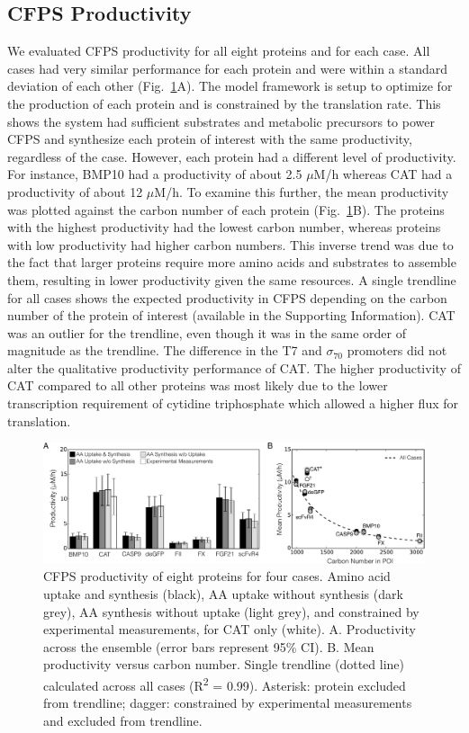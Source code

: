 \documentclass[journal=asbcd6,manuscript=article]{achemso}
\begin{document}
\subsection{CFPS Productivity}
We evaluated CFPS productivity for all eight proteins and for each case.
All cases had very similar performance for each protein and were within a standard deviation of each other (Fig.~\ref{fig:Prod}A).
The model framework is setup to optimize for the production of each protein and is constrained by the translation rate.  
This shows the system had sufficient substrates and metabolic precursors to power CFPS and synthesize each protein of interest with the same productivity, regardless of the case.
However, each protein had a different level of productivity.
For instance, BMP10 had a productivity of about 2.5 $\mu$M/h whereas CAT had a productivity of about 12 $\mu$M/h.
To examine this further, the mean productivity was plotted against the carbon number of each protein (Fig.~\ref{fig:Prod}B).
The proteins with the highest productivity had the lowest carbon number, whereas proteins with low productivity had higher carbon numbers.
This inverse trend was due to the fact that larger proteins require more amino acids and substrates to assemble them, resulting in lower productivity given the same resources.
A single trendline for all cases shows the expected productivity in CFPS depending on the carbon number of the protein of interest (available in the Supporting Information).
CAT was an outlier for the trendline, even though it was in the same order of magnitude as the trendline.
The difference in the T7 and  $\sigma_{70}$ promoters did not alter the qualitative productivity performance of CAT.
The higher productivity of CAT compared to all other proteins was most likely due to the lower transcription requirement of cytidine triphosphate which allowed a higher flux for translation.
\begin{figure}[t!]
\centering
\includegraphics[width=1.00\textwidth]{./Figures/Productivity.pdf}
\caption{CFPS productivity of eight proteins for four cases. Amino acid uptake and synthesis (black), AA uptake without synthesis (dark grey), AA synthesis without uptake (light grey), and constrained by experimental measurements, for CAT only (white). A. Productivity across the ensemble (error bars represent 95\% CI). B. Mean productivity versus carbon number. Single trendline (dotted line) calculated across all cases (R\textsuperscript{2} = 0.99). Asterisk: protein excluded from trendline; dagger: constrained by experimental measurements and excluded from trendline.}
\label{fig:Prod}
\end{figure}
\end{document}
